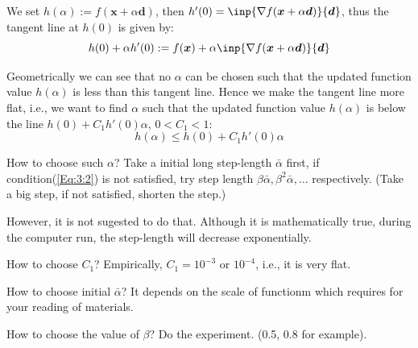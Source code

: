 We set $h(\alpha):=f(\bm x+\alpha\bm d)$, then $h'(0)=\inp{\nabla f(\bm x+\alpha\bm d)}{\bm d}$, thus the tangent line at $h(0)$ is given by:
\[
h(0)+\alpha h'(0):=f(\bm x)+\alpha\inp{\nabla f(\bm x+\alpha\bm d)}{\bm d}
\]

Geometrically we can see that no $\alpha$ can be chosen such that the updated function value $h(\alpha)$ is less than this tangent line. Hence we make the tangent line more flat, i.e., we want to find $\alpha$ such that the updated function value $h(\alpha)$ is below the line $h(0)+C_1h'(0)\alpha$, $0<C_1<1$:
\[
h(\alpha)\le h(0)+C_1h'(0)\alpha
\]

How to choose such $\alpha$? Take a initial long step-length $\bar{\alpha}$ first, if condition(\ref{Eq:3:2}) is not satisfied, try step length $\beta\bar{\alpha},\beta^2\bar{\alpha},\dots$ respectively. (Take a big step, if not satisfied, shorten the step.)
\begin{remark}
However, it is not sugested to do that. Although it is mathematically true, during the computer run, the step-length will decrease exponentially.
\end{remark}

How to choose $C_1$? Empirically, $C_1 = 10^{-3}$ or $10^{-4}$, i.e., it is very flat.

How to choose initial $\bar{\alpha}$? It depends on the scale of functionm which requires for your reading of materials.

How to choose the value of $\beta$? Do the experiment. (0.5, 0.8 for example).





